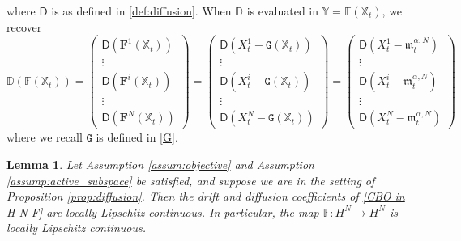 \documentclass[12pt]{amsart}
\numberwithin{equation}{section}
\newtheorem{lemma}[theorem]{Lemma}
\begin{document}
where $\mathsf{D}$ is as defined in \eqref{def:diffusion}. When $\mathbb{D}$ is evaluated in $\mathds{Y} = \mathds{F}(\mathds{X}_t)$, we recover
\[
\mathbb{D}(\mathds{F}(\mathds{X}_t)) 
=
\begin{pmatrix}
    \mathsf{D}(\mathbf{F}^{1}(\mathds{X}_t))\\
    \vdots\\
    \mathsf{D}(\mathbf{F}^{i}(\mathds{X}_t))\\
    \vdots\\
    \mathsf{D}(\mathbf{F}^{N}(\mathds{X}_t))
\end{pmatrix}
=
\begin{pmatrix}
    \mathsf{D}(X^1_t- \mathtt{G}(\mathds{X}_t))\\
    \vdots\\
    \mathsf{D}(X^i_t- \mathtt{G}(\mathds{X}_t))\\
    \vdots\\
    \mathsf{D}(X^N_t- \mathtt{G}(\mathds{X}_t))
\end{pmatrix}
=
\begin{pmatrix}
    \mathsf{D}(X^1_t- \mathfrak{m}^{\alpha,N}_{t})\\
    \vdots\\
    \mathsf{D}(X^i_t- \mathfrak{m}^{\alpha,N}_{t})\\
    \vdots\\
    \mathsf{D}(X^N_t- \mathfrak{m}^{\alpha,N}_{t})
\end{pmatrix}
\]
where we recall $\mathtt{G}$ is defined in \eqref{G}.



\begin{lemma}\label{lem: F}
Let Assumption \ref{assum:objective} and Assumption \ref{assump:active_subspace} be satisfied, and suppose we are in the setting of Proposition \ref{prop:diffusion}. Then the drift and diffusion coefficients of \eqref{CBO in H N F} are locally Lipschitz continuous. In particular, the map $\mathds{F}:H^N \to H^N$ is locally Lipschitz continuous.
\end{lemma}
\end{document}
